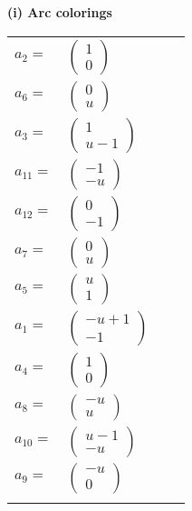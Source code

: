 \documentclass[1p]{elsarticle_modified}
\theoremstyle{definition}
\begin{document}
\flushleft \textbf{(i) Arc colorings}\\
\begin{tabular}{m{7pt} m{180pt} m{7pt} m{180pt} }
\flushright $a_{2}=$&$\begin{pmatrix}1\\0\end{pmatrix}$ \\
\flushright $a_{6}=$&$\begin{pmatrix}0\\u\end{pmatrix}$ \\
\flushright $a_{3}=$&$\begin{pmatrix}1\\u-1\end{pmatrix}$ \\
\flushright $a_{11}=$&$\begin{pmatrix}-1\\- u\end{pmatrix}$ \\
\flushright $a_{12}=$&$\begin{pmatrix}0\\-1\end{pmatrix}$ \\
\flushright $a_{7}=$&$\begin{pmatrix}0\\u\end{pmatrix}$ \\
\flushright $a_{5}=$&$\begin{pmatrix}u\\1\end{pmatrix}$ \\
\flushright $a_{1}=$&$\begin{pmatrix}- u+1\\-1\end{pmatrix}$ \\
\flushright $a_{4}=$&$\begin{pmatrix}1\\0\end{pmatrix}$ \\
\flushright $a_{8}=$&$\begin{pmatrix}- u\\u\end{pmatrix}$ \\
\flushright $a_{10}=$&$\begin{pmatrix}u-1\\- u\end{pmatrix}$ \\
\flushright $a_{9}=$&$\begin{pmatrix}- u\\0\end{pmatrix}$\\&\end{tabular}
\end{document}

